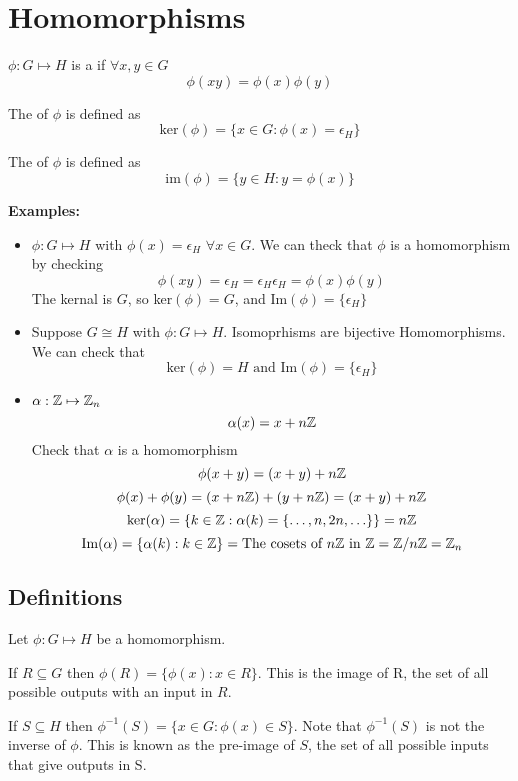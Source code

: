 \documentclass[openany]{report}
\begin{document}
\section{Homomorphisms}
$\phi: G \mapsto H$ is a  if $\forall x,y \in G$
\[\phi(xy) = \phi(x)\phi(y)\]
\begin{definition}
    The \emph{} of $\phi$ is defined as 
    \[\text{ker}(\phi) = \{x \in G : \phi(x) = \epsilon_H\}\]
\end{definition}
\begin{definition}
    The \emph{} of $\phi$ is defined as 
    \[\text{im}(\phi) = \{y \in H  :y = \phi(x) \}\]
\end{definition}
\noindent
\textbf{Examples:}
\begin{itemize}
    \item $\phi: G \mapsto H$ with $\phi(x) = \epsilon_H$ $\forall x \in G$. We can theck that $\phi$ is a homomorphism by checking 
    \[\phi(xy) = \epsilon_H = \epsilon_H\epsilon_H = \phi(x)\phi(y)\]
    The kernal is $G$, so ker$(\phi) = G$, and Im$(\phi) = \{\epsilon_H\}$
    \item Suppose $G \cong H$ with $\phi: G \mapsto H$. Isomoprhisms are bijective Homomorphisms. We can check that \[\text{ker}(\phi) = H  \text{ and } \text{Im}(\phi) = \{\epsilon_H\}\]
    \item $\alpha: \mathbb{Z} \mapsto \mathbb{Z}_n$
    \[\alpha(x) = x + n\mathbb{Z}\]
    Check that $\alpha$ is a homomorphism
    \[\phi(x+y) = (x+y) + n\mathbb{Z}\]
    \[\phi(x) + \phi(y) = (x + n\mathbb{Z}) + (y + n \mathbb{Z}) = (x+y) +n\mathbb{Z}\]
    \[\text{ker}(\alpha) = \{k \in \mathbb{Z}: \alpha(k) = \{\ldots, n, 2n, \ldots\}\} = n\mathbb{Z}\]
    \[\text{Im}(\alpha) = \{\alpha(k): k \in \mathbb{Z}\} = \text{The cosets of $n\mathbb{Z}$ in $\mathbb{Z}$} = \mathbb{Z}/n\mathbb{Z} = \mathbb{Z}_n\]
\end{itemize} 
\subsection{Definitions}
Let $\phi: G \mapsto H$ be a homomorphism.
\begin{definition}
    If $R \subseteq G$ then $\phi(R) = \{\phi(x) : x \in R\}$. This is the image of R, the set of all possible outputs with an input in $R$.
\end{definition}

\begin{definition}
    If $S \subseteq H$ then $\phi^{-1}(S) = \{x \in G: \phi(x) \in S\}$. Note that $\phi^{-1}(S)$ is not the inverse of $\phi$. This is known as the pre-image of $S$, the set of all possible inputs that give outputs in S.
\end{definition}
\end{document}
